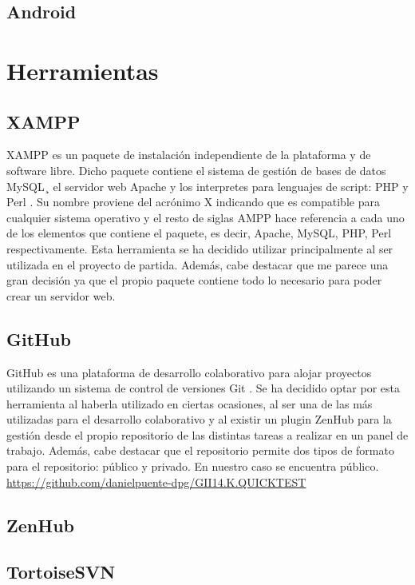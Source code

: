 \subsection{Android}

\section{Herramientas}

\subsection{XAMPP}

XAMPP es un paquete de instalación independiente de la plataforma y de software libre. Dicho paquete contiene el sistema de gestión de bases de datos MySQL¸ el servidor web Apache y los interpretes para lenguajes de script: PHP y Perl \cite{wiki:xampp}. Su nombre proviene del acrónimo X indicando que es compatible para cualquier sistema operativo y el resto de siglas AMPP hace referencia a cada uno de los elementos que contiene el paquete, es decir, Apache, MySQL, PHP, Perl respectivamente.
Esta herramienta se ha decidido utilizar principalmente al ser utilizada en el proyecto de partida. Además, cabe destacar que me parece una gran decisión ya que el propio paquete contiene todo lo necesario para poder crear un servidor web.

\subsection{GitHub}

GitHub es una plataforma de desarrollo colaborativo para alojar proyectos utilizando un sistema de control de versiones Git \cite{wiki:github}. 
Se ha decidido optar por esta herramienta al haberla utilizado en ciertas ocasiones, al ser una de las más utilizadas para el desarrollo colaborativo y al existir un plugin ZenHub para la gestión desde el propio repositorio de las distintas tareas a realizar en un panel de trabajo. Además, cabe destacar que el repositorio permite dos tipos de formato para el repositorio: público y privado. En nuestro caso se encuentra público. \url{https://github.com/danielpuente-dpg/GII14.K.QUICKTEST}

\subsection{ZenHub}\label{zenhub}

\subsection{TortoiseSVN}

